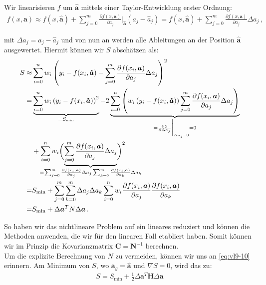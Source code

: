 Wir linearisieren $f$ um $\boldsymbol{\hat{a}}$ mittels einer Taylor-Entwicklung erster Ordnung:
\begin{align}
f(x, \boldsymbol{a}) \approx f(x, \boldsymbol{\hat{a}}) + \sum_{j=0}^m \frac{ \partial f (x, \boldsymbol{a}) }{ \partial a_j } \bigg|_{\boldsymbol{\hat{a}}} (a_j - \hat{a}_j) = f(x, \boldsymbol{\hat{a}}) + \sum_{j=0}^m \frac{ \partial f(x, \boldsymbol{a}) }{ \partial a_j } \Delta a_j\,,
\label{eq:vl9-20}
\end{align}

mit $\Delta a_j = a_j - \hat{a}_j$ und von nun an werden alle Ableitungen an der Position $\boldsymbol{\hat{a}}$ ausgewertet. Hiermit k\"onnen wir $S$ absch\"atzen als:
\begin{align}
\begin{split}
S \approx& \sum_{i=0}^n w_i \left( y_i - f(x_i, \boldsymbol{\hat{a}}) - \sum_{j=0}^m \frac{ \partial f(x_i, \boldsymbol{a}) }{ \partial a_j } \Delta a_j \right)^2\\
=& \underbrace{\sum_{i=0}^n w_i \left( y_i - f(x_i, \boldsymbol{\hat{a}}) \right)^2}_{= S_\text{min}} - 2 \underbrace{\sum_{i=0}^n \left( w_i \left( y_i - f(x_i, \boldsymbol{\hat{a}}) \right) \sum_{j=0}^m \frac{ \partial f(x_i, \boldsymbol{a}) }{ \partial a_j } \Delta a_j \right)}_{= \frac{ \partial S }{ \partial \Delta a_j} \bigg|_{\Delta a_j = 0} = 0}\\
&+ \sum_{i=0}^n w_i \biggl( {\underbrace{\sum_{j=0}^m \frac{ \partial f(x_i, \boldsymbol{a}) }{ \partial a_j } \Delta a_j}_{\mathclap{= \sum_{j=0}^m \frac{ \partial f(x_i, \boldsymbol{a}) }{ \partial a_j } \Delta a_j \sum_{k=0}^m \frac{ \partial f(x_i, \boldsymbol{a}) }{ \partial a_k } \Delta a_k}}} \biggr)^2\\
=& S_\text{min} + \sum_{j=0}^m \sum_{k=0}^m \Delta a_j \Delta a_k \sum_{i=0}^n w_i \frac{ \partial f(x_i, \boldsymbol{a}) }{ \partial a_j } \frac{ \partial f(x_i, \boldsymbol{a}) }{ \partial a_k }\\
=& S_\text{min} + \Delta \boldsymbol{a}^T N \Delta \boldsymbol{a}\,.
\label{eq:vl9-21}
\end{split}
\end{align}

So haben wir das nichtlineare Problem auf ein lineares reduziert und k\"onnen die Methoden anwenden, die wir f\"ur den linearen Fall etabliert haben. Somit k\"onnen wir im Prinzip die Kovarianzmatrix $\boldsymbol{C} = \boldsymbol{N}^{-1}$ berechnen.\\[0.3cm]
Um die explizite Berechnung von $N$ zu vermeiden, k\"onnen wir uns an \cref{eq:vl9-10} erinnern. Am Minimum von $S$, wo $\boldsymbol{a}_g = \boldsymbol{\hat{a}}$ und $\nabla S = 0$, wird das zu:
\begin{align}
S = S_\text{min} + \frac{1}{2} \Delta \boldsymbol{a}^T \boldsymbol{H} \Delta \boldsymbol{a}
\label{eq:vl9-22}
\end{align}

